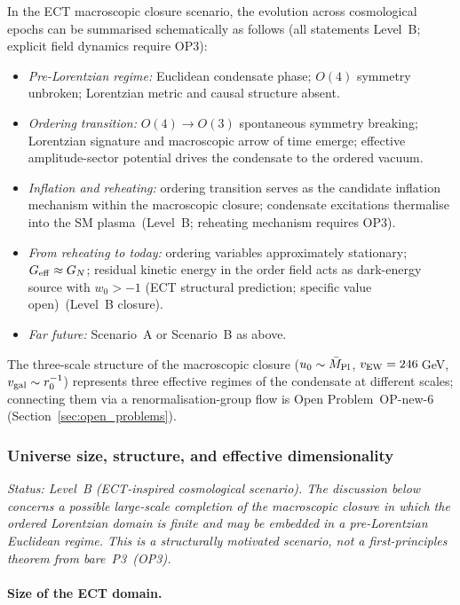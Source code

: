 \documentclass[11pt,a4paper]{article}
\numberwithin{equation}{section}
\begin{document}
In the ECT macroscopic closure scenario, the evolution across
cosmological epochs can be summarised schematically as follows
(all statements Level~B; explicit field dynamics require OP3):
\begin{itemize}
  \item \textit{Pre-Lorentzian regime:} Euclidean condensate phase;
    $O(4)$ symmetry unbroken; Lorentzian metric and causal structure
    absent.
  \item \textit{Ordering transition:} $O(4)\to O(3)$ spontaneous
    symmetry breaking; Lorentzian signature and macroscopic arrow
    of time emerge; effective amplitude-sector potential drives the
    condensate to the ordered vacuum.
  \item \textit{Inflation and reheating:} ordering transition
    serves as the candidate inflation mechanism within the
    macroscopic closure; condensate excitations thermalise into
    the SM plasma~(Level~B; reheating mechanism requires OP3).
  \item \textit{From reheating to today:} ordering variables
    approximately stationary; $G_{\rm eff}\approx G_N$;
    residual kinetic energy in the order field acts as dark-energy
    source with $w_0>-1$ (ECT structural prediction; specific value open)~(Level~B closure).
  \item \textit{Far future:} Scenario~A or Scenario~B as above.
\end{itemize}
The three-scale structure of the macroscopic closure
($u_0\sim\bar{M}_{\rm Pl}$, $v_{\rm EW}=246$\,GeV,
$v_{\rm gal}\sim r_0^{-1}$) represents three effective regimes
of the condensate at different scales; connecting them via a
renormalisation-group flow is Open Problem~OP-new-6
(Section~\ref{sec:open_problems}).


\subsubsection*{Universe size, structure, and effective dimensionality}
\label{sec:universe_size}

\textit{Status: Level~B (ECT-inspired cosmological scenario).
The discussion below concerns a possible large-scale completion
of the macroscopic closure in which the ordered Lorentzian domain
is finite and may be embedded in a pre-Lorentzian Euclidean regime.
This is a structurally motivated scenario, not a first-principles
theorem from bare~P3~(OP3).}

\paragraph{Size of the ECT domain.}
\end{document}
